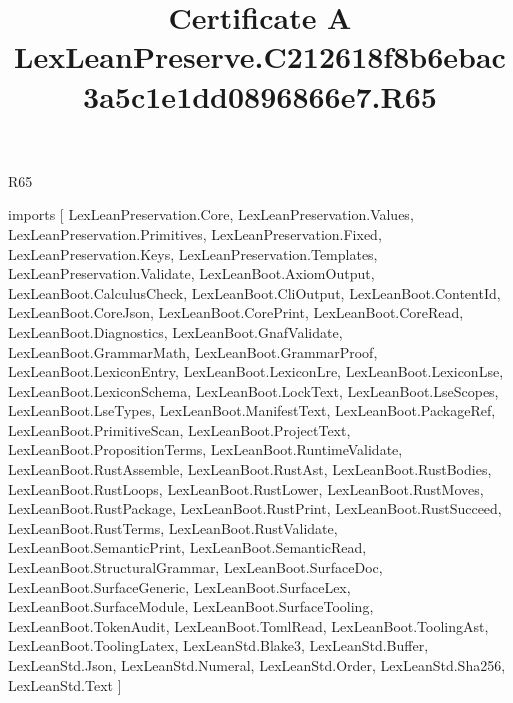 \begin{lexlean}{R65}
\title{Certificate A LexLeanPreserve.C212618f8b6ebac3a5c1e1dd0896866e7.R65}
\begin{coremodule}
imports [
  LexLeanPreservation.Core,
  LexLeanPreservation.Values,
  LexLeanPreservation.Primitives,
  LexLeanPreservation.Fixed,
  LexLeanPreservation.Keys,
  LexLeanPreservation.Templates,
  LexLeanPreservation.Validate,
  LexLeanBoot.AxiomOutput,
  LexLeanBoot.CalculusCheck,
  LexLeanBoot.CliOutput,
  LexLeanBoot.ContentId,
  LexLeanBoot.CoreJson,
  LexLeanBoot.CorePrint,
  LexLeanBoot.CoreRead,
  LexLeanBoot.Diagnostics,
  LexLeanBoot.GnafValidate,
  LexLeanBoot.GrammarMath,
  LexLeanBoot.GrammarProof,
  LexLeanBoot.LexiconEntry,
  LexLeanBoot.LexiconLre,
  LexLeanBoot.LexiconLse,
  LexLeanBoot.LexiconSchema,
  LexLeanBoot.LockText,
  LexLeanBoot.LseScopes,
  LexLeanBoot.LseTypes,
  LexLeanBoot.ManifestText,
  LexLeanBoot.PackageRef,
  LexLeanBoot.PrimitiveScan,
  LexLeanBoot.ProjectText,
  LexLeanBoot.PropositionTerms,
  LexLeanBoot.RuntimeValidate,
  LexLeanBoot.RustAssemble,
  LexLeanBoot.RustAst,
  LexLeanBoot.RustBodies,
  LexLeanBoot.RustLoops,
  LexLeanBoot.RustLower,
  LexLeanBoot.RustMoves,
  LexLeanBoot.RustPackage,
  LexLeanBoot.RustPrint,
  LexLeanBoot.RustSucceed,
  LexLeanBoot.RustTerms,
  LexLeanBoot.RustValidate,
  LexLeanBoot.SemanticPrint,
  LexLeanBoot.SemanticRead,
  LexLeanBoot.StructuralGrammar,
  LexLeanBoot.SurfaceDoc,
  LexLeanBoot.SurfaceGeneric,
  LexLeanBoot.SurfaceLex,
  LexLeanBoot.SurfaceModule,
  LexLeanBoot.SurfaceTooling,
  LexLeanBoot.TokenAudit,
  LexLeanBoot.TomlRead,
  LexLeanBoot.ToolingAst,
  LexLeanBoot.ToolingLatex,
  LexLeanStd.Blake3,
  LexLeanStd.Buffer,
  LexLeanStd.Json,
  LexLeanStd.Numeral,
  LexLeanStd.Order,
  LexLeanStd.Sha256,
  LexLeanStd.Text
]


\end{coremodule}
\end{lexlean}

